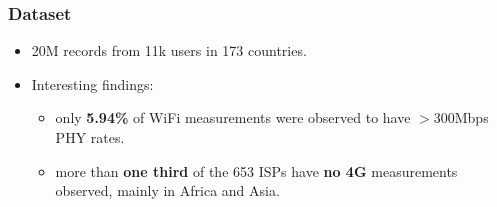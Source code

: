 
\begin{frame}
    \frametitle{Dataset}

    \begin{itemize}
        \setlength{\itemsep}{1.4em}
        \item 20M records from 11k users in 173 countries.
        \item Interesting findings:
        \begin{itemize}
            \item only \textbf{5.94\%} of WiFi measurements were observed to have $>$300Mbps PHY rates.
            \item more than \textbf{one third} of the 653 ISPs have \textbf{no 4G} measurements observed, mainly in Africa and Asia.
        \end{itemize}
    \end{itemize}
\end{frame}
